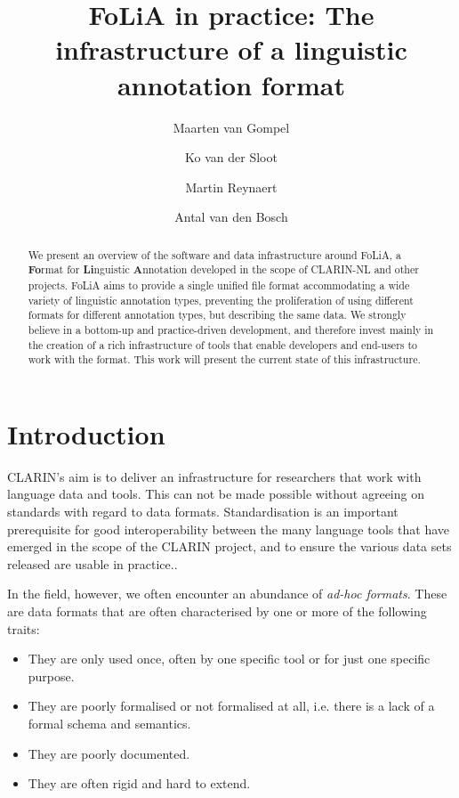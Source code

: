 \documentclass[a4paper,11pt]{article}
\begin{document}
\title{FoLiA in practice: The infrastructure of a linguistic annotation format}
\author{Maarten van Gompel \and Ko van der Sloot \and Martin Reynaert \and Antal van den Bosch}
\date{}

\maketitle

\begin{abstract}
We present an overview of the software and data infrastructure around FoLiA, a
\textbf{Fo}rmat for \textbf{Li}nguistic \textbf{A}nnotation developed in the
scope of CLARIN-NL and other projects.  FoLiA aims to provide a single unified
file format accommodating a wide variety of linguistic annotation types,
preventing the proliferation of using different formats for different
annotation types, but describing the same data. We strongly believe in a
bottom-up and practice-driven development, and therefore invest mainly in the
creation of a rich infrastructure of tools that enable developers and end-users
to work with the format. This work will present the current state of this
infrastructure.
\end{abstract}


\section{Introduction}

CLARIN's aim is to deliver an infrastructure for researchers that work with
language data and tools. This can not be made possible without agreeing on standards
with regard to data formats. Standardisation is an important prerequisite for
good interoperability between the many language tools that have emerged in the scope
of the CLARIN project, and to ensure the various data sets released are usable
in practice..

In the field, however, we often encounter an abundance of \emph{ad-hoc formats}. These are
data formats that are often characterised by one or more of the following traits:

\begin{itemize}
    \item They are only used once, often by one specific tool or for just one specific purpose.
    \item They are poorly formalised or not formalised at all, i.e. there is a lack of a formal schema and semantics.
    \item They are poorly documented.
    \item They are often rigid and hard to extend.
\end{itemize}
\end{document}
